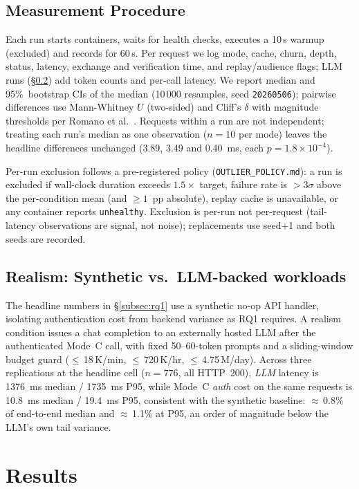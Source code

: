 \documentclass[conference]{IEEEtran}
\begin{document}
\subsection{Measurement Procedure}

Each run starts containers, waits for health checks, executes a 10\,s warmup (excluded) and records for 60\,s. Per request we log mode, cache, churn, depth, status, latency, exchange and verification time, and replay/audience flags; LLM runs (\S\ref{subsec:realism}) add token counts and per-call latency. We report median and 95\%~bootstrap CIs of the median (10\,000 resamples, seed \texttt{20260506}); pairwise differences use Mann-Whitney $U$ (two-sided) and Cliff's $\delta$ with magnitude thresholds per Romano et al.~\cite{romano2006appropriate}. Requests within a run are not independent; treating each run's median as one observation ($n=10$ per mode) leaves the headline differences unchanged (3.89, 3.49 and 0.40~ms, each $p=1.8\times10^{-4}$).

Per-run exclusion follows a pre-registered policy (\texttt{OUTLIER\_POLICY.md}): a run is excluded if wall-clock duration exceeds $1.5\times$ target, failure rate is $>3\sigma$ above the per-condition mean (and $\ge 1$~pp absolute), replay cache is unavailable, or any container reports \texttt{unhealthy}. Exclusion is per-run not per-request (tail-latency observations are signal, not noise); replacements use seed+1 and both seeds are recorded.

\subsection{Realism: Synthetic vs.\ LLM-backed workloads}
\label{subsec:realism}

The headline numbers in \S\ref{subsec:rq1} use a synthetic no-op API handler, isolating authentication cost from backend variance as RQ1 requires. A realism condition issues a chat completion to an externally hosted LLM after the authenticated Mode~C call, with fixed 50--60-token prompts and a sliding-window budget guard ($\le$\,18\,K/min, $\le$\,720\,K/hr, $\le$\,4.75\,M/day). Across three replications at the headline cell ($n=776$, all HTTP~200), \emph{LLM} latency is 1376~ms median / 1735~ms P95, while Mode~C \emph{auth} cost on the same requests is 10.8~ms median / 19.4~ms P95, consistent with the synthetic baseline: $\approx$\,0.8\% of end-to-end median and $\approx$\,1.1\% at P95, an order of magnitude below the LLM's own tail variance.

\section{Results}
\label{sec:results}
\end{document}
